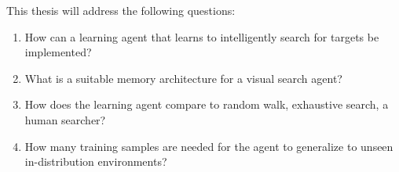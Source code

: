 % 
% 
% 
% 
% 
% 
% 
% 

This thesis will address the following questions:

\begin{enumerate}
  \item \label{itm:rq1} How can a learning agent that learns to intelligently search for targets be implemented?
  \item What is a suitable memory architecture for a visual search agent?
  \item \label{itm:rq2} How does the learning agent compare to random walk, exhaustive search, a human searcher?
  \item \label{itm:rq3} How many training samples are needed for the agent to generalize to unseen in-distribution environments?
\end{enumerate}

